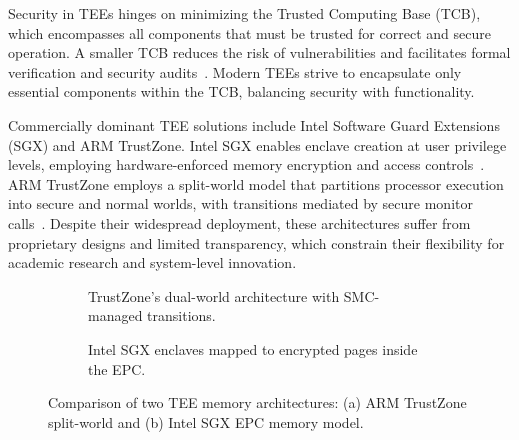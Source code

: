Security in TEEs hinges on minimizing the Trusted Computing Base (TCB), which encompasses all components that must be trusted for correct and secure operation. A smaller TCB reduces the risk of vulnerabilities and facilitates formal verification and security audits~\cite{lee2019keystone,Survey2023}. Modern TEEs strive to encapsulate only essential components within the TCB, balancing security with functionality.

Commercially dominant TEE solutions include Intel Software Guard Extensions (SGX) and ARM TrustZone. Intel SGX enables enclave creation at user privilege levels, employing hardware-enforced memory encryption and access controls~\cite{costan2016intel}. ARM TrustZone employs a split-world model that partitions processor execution into secure and normal worlds, with transitions mediated by secure monitor calls~\cite{yan2018trustzone}. Despite their widespread deployment, these architectures suffer from proprietary designs and limited transparency, which constrain their flexibility for academic research and system-level innovation.

\begin{figure}[htbp]
\centering
\begin{subfigure}[b]{0.48\linewidth}
  \centering
  \caption{TrustZone's dual-world architecture with SMC-managed transitions.}
  \label{fig:trustzone}
\end{subfigure}
\hfill
\begin{subfigure}[b]{0.48\linewidth}
  \centering
  \caption{Intel SGX enclaves mapped to encrypted pages inside the EPC.}
  \label{fig:sgx-epc}
\end{subfigure}
\caption{Comparison of two TEE memory architectures: (a) ARM TrustZone split-world and (b) Intel SGX EPC memory model.}
\label{fig:tee-architectures}
\end{figure}

